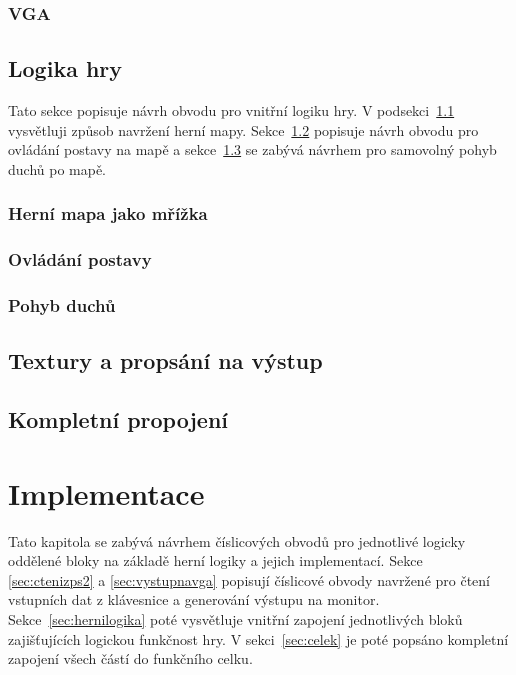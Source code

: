 \documentclass{report}
\begin{document}
\subsection{VGA}\label{sec:vgasub}

\section{Logika hry}\label{sec:logikahry}
Tato sekce popisuje návrh obvodu pro vnitřní logiku hry. V podsekci~\ref{sec:mapajakomrizka} vysvětluji způsob navržení herní mapy. Sekce~\ref{sec:ovladanipostavy} popisuje návrh obvodu pro ovládání postavy na mapě a  sekce~\ref{sec:pohybduchu} se zabývá návrhem pro samovolný pohyb duchů po mapě.
\subsection{Herní mapa jako mřížka}\label{sec:mapajakomrizka}
\subsection{Ovládání postavy}\label{sec:ovladanipostavy}
\subsection{Pohyb duchů}\label{sec:pohybduchu}

\section{Textury a propsání na výstup}\label{sec:textury}

\section{Kompletní propojení}\label{sec:kompletnipropojeni}

\chapter{Implementace}
Tato kapitola se zabývá návrhem číslicových obvodů pro jednotlivé logicky oddělené bloky na základě herní logiky a jejich implementací. Sekce \ref{sec:ctenizps2} a \ref{sec:vystupnavga} popisují číslicové obvody navržené pro čtení vstupních dat z klávesnice a generování výstupu na monitor. Sekce~\ref{sec:hernilogika} poté vysvětluje vnitřní zapojení jednotlivých bloků zajišťujících logickou funkčnost hry. V sekci~\ref{sec:celek} je poté popsáno kompletní zapojení všech částí do funkčního celku.
\end{document}
